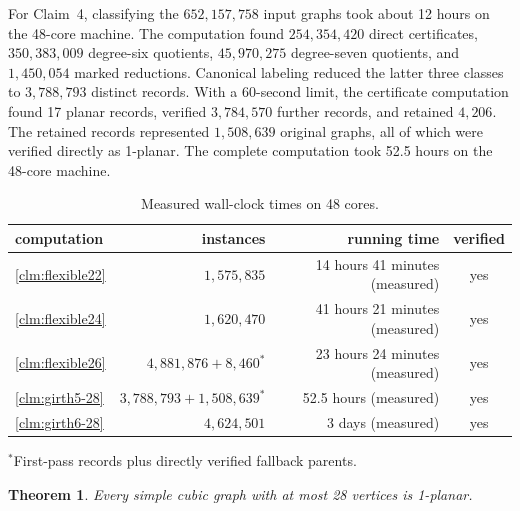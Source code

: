 \documentclass[a4paper,11pt]{article}
\theoremstyle{plain}
\newtheorem{theorem}{Theorem}
\theoremstyle{definition}  %
\begin{document}
For Claim~4, classifying the $652{,}157{,}758$ input graphs took about 12 hours
on the 48-core machine.  The computation found $254{,}354{,}420$ direct
certificates, $350{,}383{,}009$ degree-six quotients, $45{,}970{,}275$
degree-seven quotients, and $1{,}450{,}054$ marked reductions.  Canonical
labeling reduced the latter three classes to $3{,}788{,}793$ distinct records.
With a 60-second limit, the certificate computation found 17 planar records,
verified $3{,}784{,}570$ further records, and retained $4{,}206$.  The retained
records represented $1{,}508{,}639$ original graphs, all of which were verified
directly as 1-planar.  The complete computation took 52.5 hours on the
48-core machine.

\begin{table}[!ht]
    \small
    \centering
    \caption{Measured wall-clock times on 48 cores.}
    \label{tab:cubic28-runtime}
    \begin{tabular}{@{}lrrc@{}}
        \toprule
        computation & instances & running time & verified \\
        \midrule
        \cref{clm:flexible22} & $1{,}575{,}835$ & 14 hours 41 minutes (measured) & yes \\
        \cref{clm:flexible24} & $1{,}620{,}470$ & 41 hours 21 minutes (measured) & yes \\
        \cref{clm:flexible26} & $4{,}881{,}876+8{,}460^\ast$ & 23 hours 24 minutes (measured) & yes \\
        \cref{clm:girth5-28}  & $3{,}788{,}793+1{,}508{,}639^\ast$ & 52.5 hours (measured) & yes \\
        \cref{clm:girth6-28}  & $4{,}624{,}501$ & 3 days (measured) & yes \\
        \bottomrule
    \end{tabular}
    \par\smallskip
    {\footnotesize $^\ast$First-pass records plus directly verified fallback parents.\par}
\end{table}

\begin{theorem}\label{thm:cubic28}
    Every simple cubic graph with at most 28 vertices is 1-planar.
\end{theorem}
\end{document}
